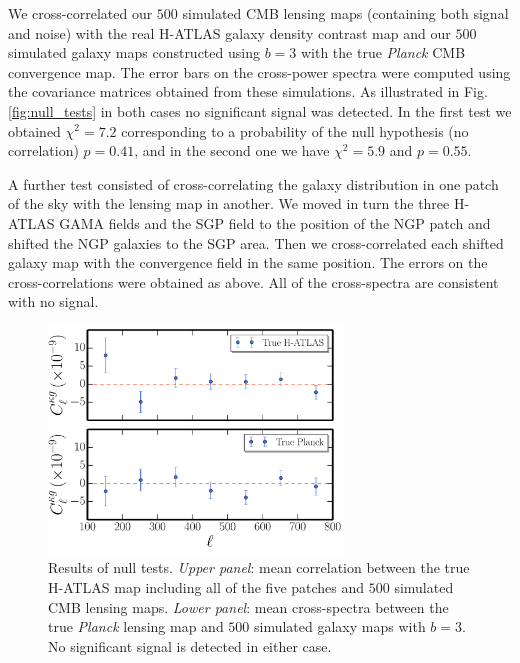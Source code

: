 We cross-correlated our $500$ simulated \gls{CMB} lensing maps (containing both signal and noise) with the real H-ATLAS galaxy density contrast map and our $500$ simulated galaxy maps constructed using $b=3$ with the true \emph{Planck}  \gls{CMB} convergence map. The error bars on the cross-power spectra were computed using the covariance matrices obtained from these simulations. As illustrated in Fig. \eqref{fig:null_tests} in both cases no significant signal was detected. In the first test we obtained $\chi^2 = 7.2$ corresponding to a probability of the null hypothesis (no correlation) $p=0.41$, and in the second one we have $\chi^2 = 5.9$ and $p=0.55$.

A further test consisted of cross-correlating the galaxy distribution in one patch of the sky with the lensing map in another. We moved in turn the three H-ATLAS GAMA fields and the SGP field to the position of the NGP patch and shifted  the NGP galaxies to the SGP area. Then we cross-correlated each shifted galaxy map with the convergence field in the same position. The errors on the cross-correlations were obtained as above. All of the cross-spectra are consistent with no signal.

\begin{figure} %
\centering %
\includegraphics[width=0.7\textwidth]{Chapter3/Images/f13}
\caption{Results of null tests. \emph{Upper panel}: mean correlation between the true H-ATLAS map including all of the five patches and $500$ simulated \gls{CMB} lensing maps.
\emph{Lower panel}: mean cross-spectra between the true \emph{Planck} lensing map and $500$ simulated galaxy maps with $b=3$. No significant signal is detected in either case.
\label{fig:null_tests}}
\end{figure}

